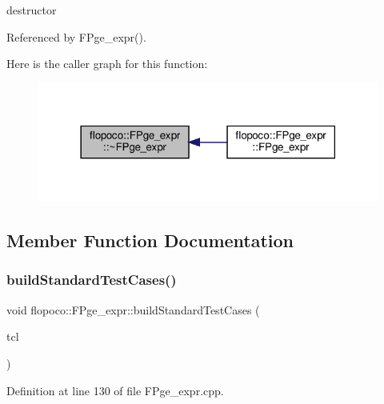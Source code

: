 destructor 



Referenced by F\+Pge\+\_\+expr().

Here is the caller graph for this function\+:
\nopagebreak
\begin{figure}[H]
\begin{center}
\leavevmode
\includegraphics[width=318pt]{d7/d73/classflopoco_1_1FPge__expr_a17d026ce2fb239876c9966565a7d8796_icgraph}
\end{center}
\end{figure}


\subsection{Member Function Documentation}
\mbox{\label{classflopoco_1_1FPge__expr_a56c1d6cd2fa14d780206742725b3d8a6}} 
\subsubsection{\texorpdfstring{build\+Standard\+Test\+Cases()}{buildStandardTestCases()}}
{\footnotesize\ttfamily void flopoco\+::\+F\+Pge\+\_\+expr\+::build\+Standard\+Test\+Cases (\begin{DoxyParamCaption}\item[{Test\+Case\+List $\ast$}]{tcl }\end{DoxyParamCaption})\hspace{0.3cm}{\ttfamily [override]}}



Definition at line 130 of file F\+Pge\+\_\+expr.\+cpp.

\mbox{\label{classflopoco_1_1FPge__expr_a5c3017a5b30a5ca73565ef827d52ce8c}} 
